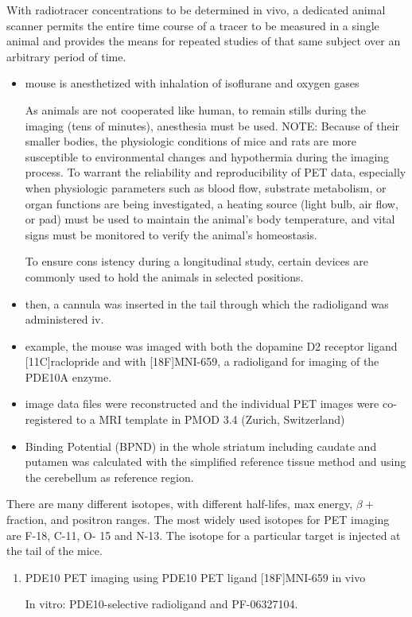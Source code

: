 With radiotracer concentrations to be determined in vivo, a dedicated animal
scanner permits the entire time course of a tracer to be measured in a single
animal and provides the means for repeated studies of that same subject over an
arbitrary period of time.
\begin{itemize}
  \item mouse is anesthetized with inhalation of isoflurane and oxygen gases
  
As animals are not cooperated like human, to remain stills during the imaging
(tens of minutes), anesthesia must be used.
NOTE: Because of their smaller bodies, the physiologic conditions of mice and
rats are more susceptible to environmental changes and hypothermia during the
imaging process.
To warrant the reliability and reproducibility of PET data, especially when
physiologic parameters such as blood flow, substrate metabolism, or organ
functions are being investigated, a heating source (light bulb, air flow, or
pad) must be used to maintain the animal's body temperature, and vital signs
must be monitored to verify the animal's homeostasis.

To ensure cons istency during a longitudinal study, certain devices are commonly
used to hold the animals in selected positions.

  \item then, a cannula was inserted in the tail through which the radioligand
  was administered iv.
  \item example, the mouse was imaged with both the dopamine D2
  receptor ligand [11C]raclopride and with [18F]MNI-659, a radioligand for
  imaging of the PDE10A enzyme. 
  
  \item image data files were reconstructed and the individual PET images were
  co-registered to a MRI template in PMOD 3.4 (Zurich, Switzerland)
  
  \item Binding Potential (BPND) in the whole striatum including caudate and putamen was
calculated with the simplified reference tissue method and using the cerebellum
as reference region.
\end{itemize}

There are many different isotopes, with different half-lifes, max energy,
$\beta+$ fraction, and positron ranges. The most widely used isotopes for PET
imaging are F-18, C-11, O- 15 and N-13. The isotope for a particular target is
injected at the tail of the mice.
\begin{enumerate}
  \item PDE10 PET imaging using PDE10 PET ligand [18F]MNI-659 in vivo
  
In vitro: PDE10-selective radioligand  and PF-06327104.

\end{enumerate}

